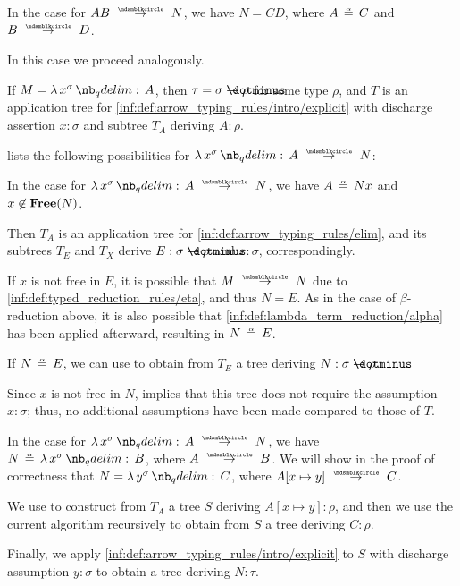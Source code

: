 \begin{algorithm}
\begin{thmenum}
\begin{thmenum}
       In the case  for \( A B \pred N \), we have \( N = CD \), where \( A \aequiv C \) and \( B \pred D \).

      In this case we proceed analogously.
    \end{thmenum}

     If \( M = \qabs {x^\sigma} A \), then \( \tau = \sigma \synimplies \rho \) for some type \( \rho \), and \( T \) is an application tree for \ref{inf:def:arrow_typing_rules/intro/explicit} with discharge assertion \( x: \sigma \) and subtree \( T_A \) deriving \( A: \rho \).

     lists the following possibilities for \( \qabs {x^\sigma} A \pred N \):
    \begin{thmenum}
       In the case  for \( \qabs {x^\sigma} A \pred N \), we have \( A \aequiv Nx \) and \( x \not\in \op*{Free}(N) \).

      Then \( T_A \) is an application tree for \ref{inf:def:arrow_typing_rules/elim}, and its subtrees \( T_E \) and \( T_X \) derive \( E: \sigma \synimplies \rho \) and \( x: \sigma \), correspondingly.

      If \( x \) is not free in \( E \), it is possible that \( M \pred N \) due to \ref{inf:def:typed_reduction_rules/eta}, and thus \( N = E \). As in the case of \( \beta \)-reduction above, it is also possible that \ref{inf:def:lambda_term_reduction/alpha} has been applied afterward, resulting in \( N \aequiv E \).

      If \( N \aequiv E \), we can use  to obtain from \( T_E \) a tree deriving \( N: \sigma \synimplies \rho \).

      Since \( x \) is not free in \( N \),  implies that this tree does not require the assumption \( x: \sigma \); thus, no additional assumptions have been made compared to those of \( T \).

       In the case  for \( \qabs {x^\sigma} A \pred N \), we have \( N \aequiv \qabs {x^\sigma} B \), where \( A \pred B \). We will show in the proof of correctness that \( N = \qabs {y^\sigma} C \), where \( A[x \mapsto y] \pred C \).

      We use  to construct from \( T_A \) a tree \( S \) deriving \( A[x \mapsto y]: \rho \), and then we use the current algorithm recursively to obtain from \( S \) a tree deriving \( C: \rho \).

      Finally, we apply \ref{inf:def:arrow_typing_rules/intro/explicit} to \( S \) with discharge assumption \( y: \sigma \) to obtain a tree deriving \( N: \tau \).
    \end{thmenum}
  \end{thmenum}
\end{algorithm}
